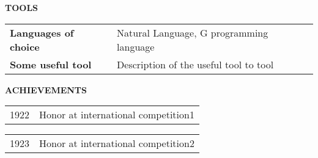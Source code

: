 \documentclass[11pt,english]{article}
\begin{document}
\medskip

\selectfont

\hspace{-20mm}\colorbox{maincolor}{\begin{minipage}[t][8mm][c]{75mm}
\hspace{20mm}\bfseries \color{white}  TOOLS
\end{minipage}}
\vspace{6mm}

\begin{minipage}{\textwidth}


  \begin{tabular}{ @{} p{32mm} p{135mm} @{} }
  
    \bf\small Languages of choice & {\small Natural Language, G programming language} \\
  
    \bf\small Some useful tool & {\small Description of the useful tool to tool} \\
  
  \end{tabular}
  \vspace{10mm}

\end{minipage}%
%
%
%
%
%
%
%

\medskip

\selectfont

\hspace{-20mm}\colorbox{maincolor}{\begin{minipage}[t][8mm][c]{75mm}
\hspace{20mm}\bfseries \color{white}  ACHIEVEMENTS
\end{minipage}}
\vspace{6mm}

\begin{minipage}{\textwidth}


  
    \begin{tabular}{ @{} p{32mm} p{135mm} @{} }
    {1922} & {\small Honor at international competition1}
    \end{tabular}
    \vspace{1mm}
  
    \begin{tabular}{ @{} p{32mm} p{135mm} @{} }
    {1923} & {\small Honor at international competition2}
    \end{tabular}
    \vspace{1mm}
  


\end{minipage}%
%
%
%
%
%
%
%
\end{document}
